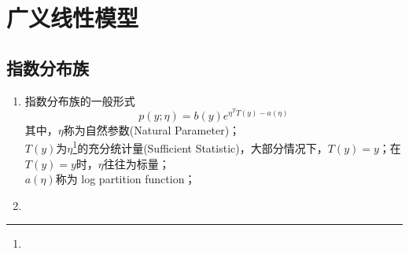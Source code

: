 \section{广义线性模型}
\subsection{指数分布族}
\begin{enumerate}
	\item 指数分布族的一般形式
	\begin{equation}
		p(y;\eta) = b(y)e^{\eta^T T(y) - a(\eta)}
	\end{equation}
	其中，$\eta$称为自然参数(Natural Parameter)； \\
	$T(y)$为$\eta$\footnote{\color{red}{应该是$\eta$，因为指数分布族的参数只有$\eta$，但正确与否待确认}}的充分统计量(Sufficient Statistic)，大部分情况下，$T(y) = y$；在$T(y)=y$时，$\eta$往往为标量； \\
	$a(\eta)$称为 log partition function；
	\item 
\end{enumerate}

